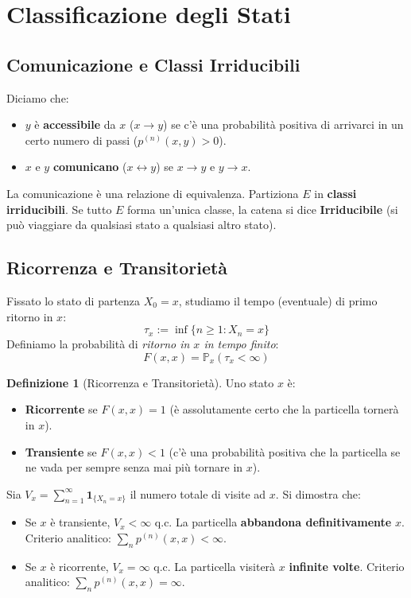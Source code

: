 \documentclass[11pt, a4paper]{report}
\theoremstyle{plain}
\theoremstyle{definition}
\newtheorem{definition}[theorem]{Definizione}
\theoremstyle{remark}
\newcommand{\PP}{\mathbb{P}}
\newcommand{\1}{\mathbf{1}}
\begin{document}
\section{Classificazione degli Stati}

\subsection{Comunicazione e Classi Irriducibili}
Diciamo che:
\begin{itemize}
    \item $y$ è \textbf{accessibile} da $x$ ($x \to y$) se c'è una probabilità positiva di arrivarci in un certo numero di passi ($p^{(n)}(x,y) > 0$).
    \item $x$ e $y$ \textbf{comunicano} ($x \leftrightarrow y$) se $x \to y$ e $y \to x$.
\end{itemize}
La comunicazione è una relazione di equivalenza. Partiziona $E$ in \textbf{classi irriducibili}. Se tutto $E$ forma un'unica classe, la catena si dice \textbf{Irriducibile} (si può viaggiare da qualsiasi stato a qualsiasi altro stato).

\subsection{Ricorrenza e Transitorietà}
Fissato lo stato di partenza $X_0 = x$, studiamo il tempo (eventuale) di primo ritorno in $x$:
\[ \tau_x := \inf\{n \ge 1 : X_n = x\} \]
Definiamo la probabilità di \emph{ritorno in $x$ in tempo finito}:
\[ F(x, x) = \PP_x(\tau_x < \infty) \]

\begin{definition}[Ricorrenza e Transitorietà]
Uno stato $x$ è:
\begin{itemize}
    \item \textbf{Ricorrente} se $F(x, x) = 1$ (è assolutamente certo che la particella tornerà in $x$).
    \item \textbf{Transiente} se $F(x, x) < 1$ (c'è una probabilità positiva che la particella se ne vada per sempre senza mai più tornare in $x$).
\end{itemize}
\end{definition}

Sia $V_x = \sum_{n=1}^\infty \1_{\{X_n = x\}}$ il numero totale di visite ad $x$. Si dimostra che:
\begin{itemize}
    \item Se $x$ è transiente, $V_x < \infty$ q.c. La particella \textbf{abbandona definitivamente} $x$. Criterio analitico: $\sum_n p^{(n)}(x,x) < \infty$.
    \item Se $x$ è ricorrente, $V_x = \infty$ q.c. La particella visiterà $x$ \textbf{infinite volte}. Criterio analitico: $\sum_n p^{(n)}(x,x) = \infty$.
\end{itemize}
\end{document}
